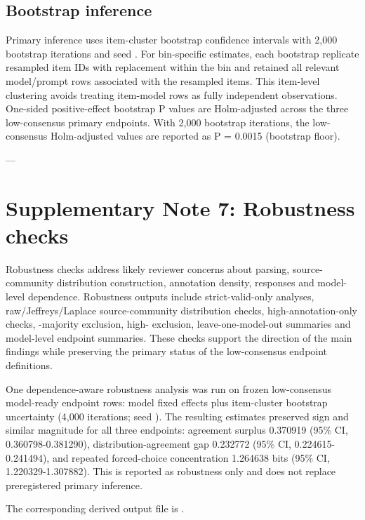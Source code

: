 \documentclass[11pt]{article}
\begin{document}
\subsection{Bootstrap inference}

Primary inference uses item-cluster bootstrap confidence intervals with 2,000 bootstrap iterations and seed . For bin-specific estimates, each bootstrap replicate resampled item IDs with replacement within the bin and retained all relevant model/prompt rows associated with the resampled items. This item-level clustering avoids treating item-model rows as fully independent observations. One-sided positive-effect bootstrap P values are Holm-adjusted across the three low-consensus primary endpoints. With 2,000 bootstrap iterations, the low-consensus Holm-adjusted values are reported as P = 0.0015 (bootstrap floor).

---

\section{Supplementary Note 7: Robustness checks}

Robustness checks address likely reviewer concerns about parsing, source-community distribution construction, annotation density,  responses and model-level dependence. Robustness outputs include strict-valid-only analyses, raw/Jeffreys/Laplace source-community distribution checks, high-annotation-only checks, -majority exclusion, high- exclusion, leave-one-model-out summaries and model-level endpoint summaries. These checks support the direction of the main findings while preserving the primary status of the low-consensus endpoint definitions.

One dependence-aware robustness analysis was run on frozen low-consensus model-ready endpoint rows: model fixed effects plus item-cluster bootstrap uncertainty (4,000 iterations; seed ). The resulting estimates preserved sign and similar magnitude for all three endpoints: agreement surplus 0.370919 (95\% CI, 0.360798-0.381290), distribution-agreement gap 0.232772 (95\% CI, 0.224615-0.241494), and repeated forced-choice concentration 1.264638 bits (95\% CI, 1.220329-1.307882). This is reported as robustness only and does not replace preregistered primary inference.

The corresponding derived output file is .
\end{document}
